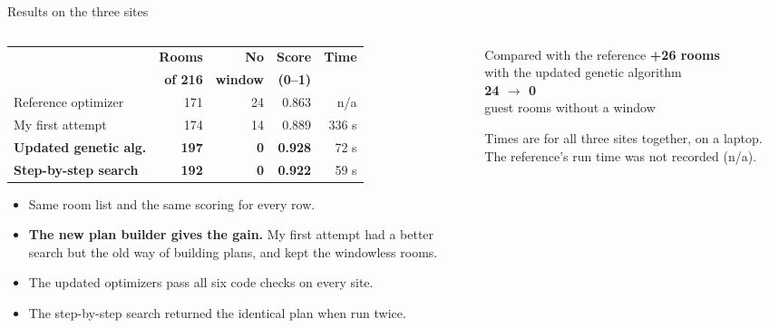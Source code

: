 \documentclass[9pt,aspectratio=169]{beamer}
\newcommand{\bignum}[2]{{\color{#1}\fontsize{30}{32}\selectfont\bfseries #2}}
\begin{document}
\begin{frame}{Results on the three sites}
\begin{columns}[c]
\begin{column}{0.56\textwidth}
{\small
\begin{tabular}{@{}lrrrr@{}}
\toprule
 & \textbf{Rooms} & \textbf{No} & \textbf{Score} & \textbf{Time} \\
 & \textbf{of 216} & \textbf{window} & \textbf{(0--1)} & \\ \midrule
Reference optimizer & 171 & 24 & 0.863 & n/a \\
My first attempt & 174 & 14 & 0.889 & 336 s \\
\textbf{Updated genetic alg.} & \textbf{197} & \textbf{0} & \textbf{0.928} & 72 s \\
\textbf{Step-by-step search} & \textbf{192} & \textbf{0} & \textbf{0.922} & 59 s \\
\bottomrule
\end{tabular}}

\vspace{0.3cm}
\begin{itemize}
\item Same room list and the same scoring for every row.
\item \textbf{The new plan builder gives the gain.} My first attempt had a better search but the old way of building plans, and kept the windowless rooms.
\item The updated optimizers pass all six code checks on every site.
\item The step-by-step search returned the identical plan when run twice.
\end{itemize}
\end{column}
\begin{column}{0.4\textwidth}
\begin{block}{Compared with the reference}
\centering
\bignum{ok}{+26 rooms}\\ with the updated genetic algorithm\\[0.35cm]
\bignum{ok}{24 $\rightarrow$ 0}\\ guest rooms without a window
\end{block}
{\small\color{muted} Times are for all three sites together, on a laptop. The reference's run time was not recorded (n/a).}
\end{column}
\end{columns}
\end{frame}
\end{document}
